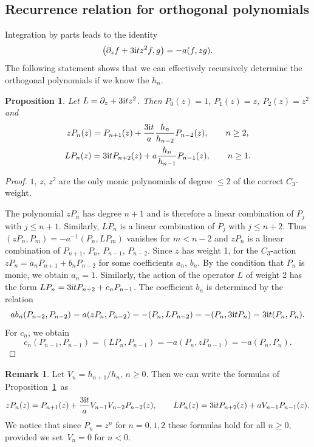 \documentclass[pdftex]{sigma}
\numberwithin{equation}{section}
\newtheorem{Proposition}[Theorem]{Proposition}
\theoremstyle{definition}
\newtheorem{Remark}[Theorem]{Remark}
\begin{document}
\subsection{Recurrence relation for orthogonal polynomials}
Integration by parts leads to the identity
\begin{equation}\label{e-0}
\bigl(\partial_zf+3{\rm i}tz^2f,g\bigr)=-a(f,zg).
\end{equation}
The following statement shows that we can effectively recursively determine the orthogonal polynomials if we know the $h_n$.
\begin{Proposition}\label{p-1} Let $L=\partial_z+3{\rm i}tz^2$. Then $P_0(z)=1$, $P_1(z)=z$, $P_2(z)=z^2$ and
 \begin{gather*}
 zP_n(z) = P_{n+1}(z)+\frac{3{\rm i}t}{a}\frac{h_n}{h_{n-2}}P_{n-2}(z),\qquad n\geq2,
 \\
 LP_n(z) = 3{\rm i}t P_{n+2}(z)+a\frac{h_n}{h_{n-1}}P_{n-1}(z),\qquad n\geq1.
 \end{gather*}
\end{Proposition}
\begin{proof}
 $1$, $z$, $z^2$ are the only monic polynomials of degree $\leq2$ of the correct $C_3$-weight.

 The polynomial $zP_n$ has degree $n+1$ and is therefore a linear combination of $P_j$ with $j\leq n+1$. Similarly, $LP_n$ is a linear combination of $P_j$ with $j\leq n+2$. Thus $(zP_n,P_m)=-a^{-1}(P_n,LP_m)$ vanishes for $m<n-2$ and $zP_n$ is a linear combination of $P_{n+1}$, $P_n$, $P_{n-1}$, $P_{n-2}$. Since $z$ has weight 1, for the $C_3$-action
 $ zP_n=a_nP_{n+1}+b_nP_{n-2}$
 for some coefficients $a_n$, $b_n$.
 By the condition that $P_n$ is monic, we obtain $a_n=1$. Similarly, the action of the operator $L$ of weight 2 has the form
 $
 LP_n=3{\rm i}t P_{n+2}+c_nP_{n-1}$.
 The coefficient $b_n$ is determined by the relation
 \[
 ab_n(P_{n-2},P_{n-2})=a(zP_n,P_{n-2})=-(P_n,LP_{n-2})=-(P_n,3{\rm i}t P_n)=3{\rm i}t(P_n,P_n).
 \]
 For $c_n$, we obtain
 \[
 c_n(P_{n-1},P_{n-1})=(LP_n,P_{n-1})=-a(P_n,zP_{n-1})=-a(P_n,P_n).\tag*{\qed}
 \]
 \renewcommand{\qed}{}
\end{proof}

\begin{Remark}\label{r-1}
 Let $V_n=h_{n+1}/h_n$, $n\geq0$. Then we can write the formulas of Proposition~\ref{p-1}~as
 \begin{align*}
 zP_n(z) = P_{n+1}(z)+\frac{3{\rm i}t}{a}V_{n-1}V_{n-2}P_{n-2}(z),
 \qquad
 LP_n(z) = 3{\rm i}t P_{n+2}(z)+aV_{n-1}P_{n-1}(z).
 \end{align*}
 We notice that since $P_n=z^n$ for $n=0,1,2$ these formulas hold for all $n\geq0$, provided we set~${V_{n}=0}$ for $n<0$.
\end{Remark}
\end{document}
